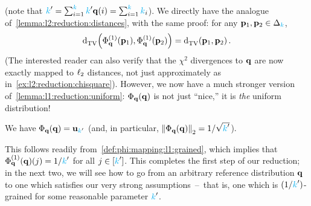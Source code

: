 (note that $\ab' = \sum_{i=1}^\ab \ab'\q(i) = \sum_{i=1}^\ab \ab_i$). We directly have the analogue of~\cref{lemma:l2:reduction:distances}, with the same proof: for any $\p_1,\p_2\in\distribs{\ab}$,
\begin{equation}
	\label{lemma:l1:reduction:distances}	
		\totalvardist{\Phi^{(1)}_\q(\p_1)}{\Phi^{(1)}_\q(\p_2)} = \totalvardist{\p_1}{\p_2}\,.
\end{equation}
(The interested reader can also verify that the $\chi^2$ divergences to $\q$ are now exactly mapped to $\lp[2]$ distances, not just approximately as in~\cref{ex:l2:reduction:chisquare}).  
However, we now have a much stronger version of~\cref{lemma:l1:reduction:uniform}: $\Phi_\q(\q)$ is not just ``nice,'' it is \emph{the} uniform distribution!
\begin{lemma}
	\label{lemma:l1:reduction:uniform}
	We have $\Phi_\q(\q)=\uniform_{\ab'}$ (and, in particular, 
	$	
		\normtwo{\Phi_\q(\q)} = {1}/{\sqrt{\ab'}}
	$).
\end{lemma}
\noindent This follows readily from~\cref{def:phi:mapping:l1:grained}, which implies that $\Phi^{(1)}_\q(\q)(j) = 1/\ab'$ for all $j\in[\ab']$. This completes the first step of our reduction; in the next two, we will see how to go from an arbitrary reference distribution $\q$ to one which satisfies our very strong assumptions~--~that is, one which is $(1/\ab')$-grained for some reasonable parameter $\ab'$.



